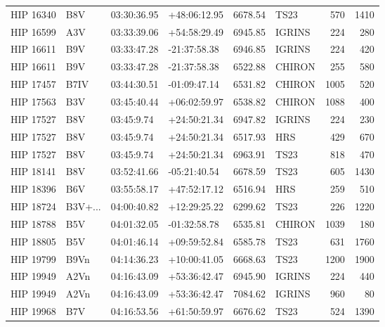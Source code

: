 \documentclass{emulateapj}
\begin{document}
\begin{longtable*}{|l|lllrlrr|}
   HIP 16340 &            B8V &    03:30:36.95 &   +48:06:12.95 &  6678.54 &       TS23 &      570 &    1410 \\
   HIP 16599 &            A3V &    03:33:39.06 &   +54:58:29.49 &  6945.85 &     IGRINS &      224 &     280 \\
   HIP 16611 &            B9V &    03:33:47.28 &   -21:37:58.38 &  6946.85 &     IGRINS &      224 &     420 \\
   HIP 16611 &            B9V &    03:33:47.28 &   -21:37:58.38 &  6522.88 &     CHIRON &      255 &     580 \\
   HIP 17457 &           B7IV &    03:44:30.51 &   -01:09:47.14 &  6531.82 &     CHIRON &     1005 &     520 \\
   HIP 17563 &            B3V &    03:45:40.44 &   +06:02:59.97 &  6538.82 &     CHIRON &     1088 &     400 \\
   HIP 17527 &            B8V &     03:45:9.74 &   +24:50:21.34 &  6947.82 &     IGRINS &      224 &     230 \\
   HIP 17527 &            B8V &     03:45:9.74 &   +24:50:21.34 &  6517.93 &        HRS &      429 &     670 \\
   HIP 17527 &            B8V &     03:45:9.74 &   +24:50:21.34 &  6963.91 &       TS23 &      818 &     470 \\
   HIP 18141 &            B8V &    03:52:41.66 &   -05:21:40.54 &  6678.59 &       TS23 &      605 &    1430 \\
   HIP 18396 &            B6V &    03:55:58.17 &   +47:52:17.12 &  6516.94 &        HRS &      259 &     510 \\
   HIP 18724 &        B3V+... &    04:00:40.82 &   +12:29:25.22 &  6299.62 &       TS23 &      226 &    1220 \\
   HIP 18788 &            B5V &    04:01:32.05 &   -01:32:58.78 &  6535.81 &     CHIRON &     1039 &     180 \\
   HIP 18805 &            B5V &    04:01:46.14 &   +09:59:52.84 &  6585.78 &       TS23 &      631 &    1760 \\
   HIP 19799 &           B9Vn &    04:14:36.23 &   +10:00:41.05 &  6668.63 &       TS23 &     1200 &    1900 \\
   HIP 19949 &           A2Vn &    04:16:43.09 &   +53:36:42.47 &  6945.90 &     IGRINS &      224 &     440 \\
   HIP 19949 &           A2Vn &    04:16:43.09 &   +53:36:42.47 &  7084.62 &     IGRINS &      960 &      80 \\
   HIP 19968 &            B7V &    04:16:53.56 &   +61:50:59.97 &  6676.62 &       TS23 &      524 &    1390 \\

\end{longtable*}
\end{document}
